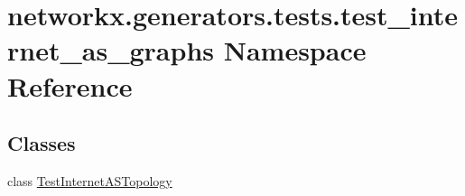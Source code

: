 \hypertarget{namespacenetworkx_1_1generators_1_1tests_1_1test__internet__as__graphs}{}\section{networkx.\+generators.\+tests.\+test\+\_\+internet\+\_\+as\+\_\+graphs Namespace Reference}
\label{namespacenetworkx_1_1generators_1_1tests_1_1test__internet__as__graphs}
\subsection*{Classes}
\begin{DoxyCompactItemize}
\item 
class \hyperlink{classnetworkx_1_1generators_1_1tests_1_1test__internet__as__graphs_1_1TestInternetASTopology}{Test\+Internet\+A\+S\+Topology}
\end{DoxyCompactItemize}
